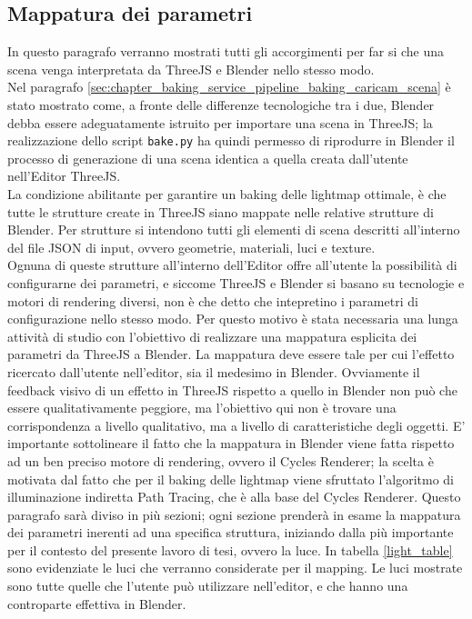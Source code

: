 \subsection{Mappatura dei parametri}
\label{sec:chapter_baking_service_pipeline_baking_mapp_parametri}

In questo paragrafo verranno mostrati tutti gli accorgimenti per far si che una scena venga interpretata da ThreeJS e Blender nello stesso modo. 
\\
Nel paragrafo \ref{sec:chapter_baking_service_pipeline_baking_caricam_scena} è stato mostrato come, a fronte delle differenze tecnologiche tra i due, Blender debba essere adeguatamente istruito per importare una scena in ThreeJS;  la realizzazione dello script \texttt{bake.py} ha quindi permesso di riprodurre in Blender il processo di generazione di una scena identica a quella creata dall’utente nell’Editor ThreeJS. 
\\
La condizione abilitante per garantire un baking delle lightmap ottimale, è che tutte le strutture create in ThreeJS siano mappate nelle relative strutture di Blender. Per strutture si intendono tutti gli elementi di scena descritti all’interno del file JSON di input, ovvero geometrie, materiali, luci e texture.
\\ 
Ognuna di queste strutture all’interno dell’Editor offre all’utente la possibilità di configurarne dei parametri, e siccome ThreeJS e Blender si basano su tecnologie e motori di rendering diversi, non è che detto che intepretino i parametri di configurazione nello stesso modo. Per questo motivo è stata necessaria una lunga attività di studio con l’obiettivo di realizzare una mappatura esplicita dei parametri da ThreeJS a Blender. La mappatura deve essere tale per cui l’effetto ricercato dall’utente nell’editor, sia il medesimo in Blender. Ovviamente il feedback visivo di un effetto in ThreeJS rispetto a quello in Blender non può che essere qualitativamente peggiore, ma l’obiettivo qui non è trovare una corrispondenza a livello qualitativo, ma a livello di caratteristiche degli oggetti. E’ importante sottolineare il fatto che la mappatura in Blender viene fatta rispetto ad un ben preciso motore di rendering, ovvero il Cycles Renderer; la scelta è motivata dal fatto che per il baking delle lightmap viene sfruttato l’algoritmo di illuminazione indiretta Path Tracing, che è alla base del Cycles Renderer. Questo paragrafo sarà diviso in più sezioni; ogni sezione prenderà in esame la mappatura dei parametri inerenti ad una specifica struttura, iniziando dalla più importante per il contesto del presente lavoro di tesi, ovvero la luce. In tabella \ref{light_table} sono evidenziate le luci che verranno considerate per il mapping. Le luci mostrate sono tutte quelle che l’utente può utilizzare nell’editor, e che hanno una controparte effettiva in Blender.
